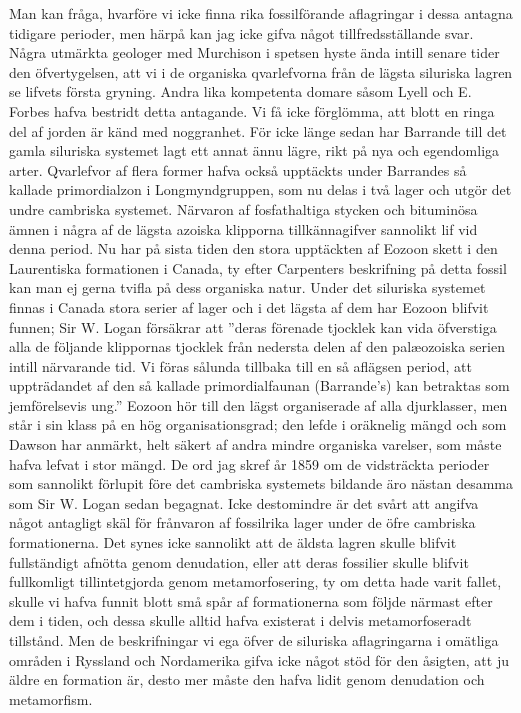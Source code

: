 Man kan fråga, hvarföre vi icke finna rika fossilförande aflagringar i dessa antagna tidigare perioder, men härpå kan jag icke gifva något tillfredsställande svar. Några utmärkta geologer med Murchison i spetsen hyste ända intill senare tider den öfvertygelsen, att vi i de organiska qvarlefvorna från de lägsta siluriska lagren se lifvets första gryning. Andra lika kompetenta domare såsom Lyell och E. Forbes hafva bestridt detta antagande. Vi få icke förglömma, att blott en ringa del af jorden är känd med noggranhet. För icke länge sedan har Barrande till det gamla siluriska systemet lagt ett annat ännu lägre, rikt på nya och egendomliga arter. Qvarlefvor af flera former hafva också upptäckts under Barrandes så kallade primordialzon i Longmyndgruppen, som nu delas i två lager och utgör det undre cambriska systemet. Närvaron af fosfathaltiga stycken och bituminösa ämnen i några af de lägsta azoiska klipporna tillkännagifver sannolikt lif vid denna period. Nu har på sista tiden den stora upptäckten af Eozoon skett i den Laurentiska formationen i Canada, ty efter Carpenters beskrifning på detta fossil kan man ej gerna tvifla på dess organiska natur. Under det siluriska systemet finnas i Canada stora serier af lager och i det lägsta af dem har Eozoon blifvit funnen; Sir W. Logan försäkrar att ”deras förenade tjocklek kan vida öfverstiga alla de följande klippornas tjocklek från nedersta delen af den palæozoiska serien intill närvarande tid. Vi föras sålunda tillbaka till en så aflägsen period, att uppträdandet af den så kallade primordialfaunan (Barrande’s) kan betraktas som jemförelsevis ung.” Eozoon hör till den lägst organiserade af alla djurklasser, men står i sin klass på en hög organisationsgrad; den lefde i oräknelig mängd och som Dawson har anmärkt, helt säkert af andra mindre organiska varelser, som måste hafva lefvat i stor mängd. De ord jag skref år 1859 om de vidsträckta perioder som sannolikt förlupit före det cambriska systemets bildande äro nästan desamma som Sir W. Logan sedan begagnat. Icke destomindre är det svårt att angifva något antagligt skäl för frånvaron af fossilrika lager under de öfre cambriska formationerna. Det synes icke sannolikt att de äldsta lagren skulle blifvit fullständigt afnötta genom denudation, eller att deras fossilier skulle blifvit fullkomligt tillintetgjorda genom metamorfosering, ty om detta hade varit fallet, skulle vi hafva funnit blott små spår af formationerna som följde närmast efter dem i tiden, och dessa skulle alltid hafva existerat i delvis metamorfoseradt tillstånd. Men de beskrifningar vi ega öfver de siluriska aflagringarna i omätliga områden i Ryssland och Nordamerika gifva icke något stöd för den åsigten, att ju äldre en formation är, desto mer måste den hafva lidit genom denudation och metamorfism.

